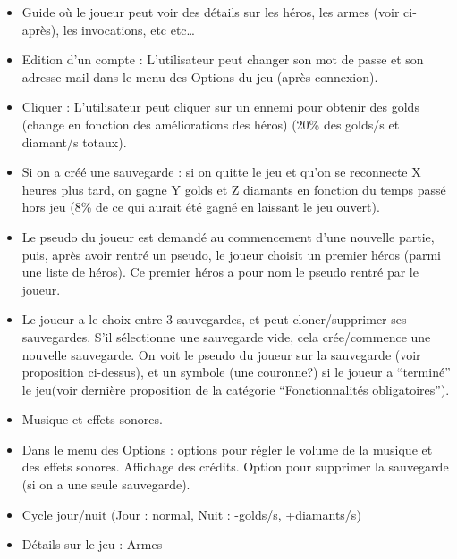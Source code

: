         \begin{itemize}
            \item Guide où le joueur peut voir des détails sur les héros, les armes (voir ci-après), les invocations, etc etc…

            \item Edition d’un compte : L’utilisateur peut changer son mot de passe et son adresse mail dans le menu des Options du jeu (après connexion).

            \item Cliquer : L’utilisateur peut cliquer sur un ennemi pour obtenir des golds (change en fonction des améliorations des héros) (20\% des golds/s et diamant/s totaux).

            \item Si on a créé une sauvegarde : si on quitte le jeu et qu’on se reconnecte X heures plus tard, on gagne Y golds et Z diamants en fonction du temps passé hors jeu (8\% de ce qui aurait été gagné en laissant le jeu ouvert).

            \item Le pseudo du joueur est demandé au commencement d’une nouvelle partie, puis, après avoir rentré un pseudo, le joueur choisit un premier héros (parmi une liste de héros). Ce premier héros a pour nom le pseudo rentré par le joueur.

            \item Le joueur a le choix entre 3 sauvegardes, et peut cloner/supprimer ses sauvegardes. S’il sélectionne une sauvegarde vide, cela crée/commence une nouvelle sauvegarde. On voit le pseudo du joueur sur la sauvegarde (voir proposition ci-dessus), et un symbole (une couronne?) si le joueur a “terminé” le jeu(voir dernière proposition de la catégorie “Fonctionnalités obligatoires”).

            \item Musique et effets sonores.

            \item Dans le menu des Options : options pour régler le volume de la musique et des effets sonores. Affichage des crédits. Option pour supprimer la sauvegarde (si on a une seule sauvegarde).

            \item Cycle jour/nuit (Jour : normal, Nuit : -golds/s, +diamants/s)

            \item Détails sur le jeu : Armes

            \begin{itemize}


\end{itemize}
\end{itemize}
